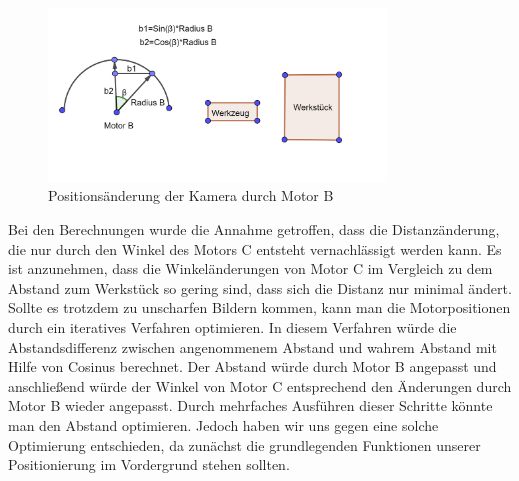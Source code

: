 \documentclass[12pt,a4paper,bibliography=totocnumbered,listof=totocnumbered]{scrartcl}
\begin{document}
\begin{figure}[htbp]
\centering 
\includegraphics[width=0.8\textwidth]{Motor_B.PNG}
\caption{Positionsänderung der Kamera durch Motor B}
\label{fig:Bild8}
\end{figure}
\break
Bei den Berechnungen wurde die Annahme getroffen, dass die Distanzänderung, die nur durch den Winkel des Motors C entsteht vernachlässigt werden kann. Es ist anzunehmen, dass die Winkeländerungen von Motor C im Vergleich zu dem Abstand zum Werkstück so gering sind, dass sich die Distanz nur minimal ändert. Sollte es trotzdem zu unscharfen Bildern kommen, kann man die Motorpositionen durch ein iteratives Verfahren optimieren. In diesem Verfahren würde die Abstandsdifferenz zwischen angenommenem Abstand und wahrem Abstand mit Hilfe von Cosinus berechnet. Der Abstand würde durch Motor B angepasst und anschließend würde der Winkel von Motor C entsprechend den Änderungen durch Motor B wieder angepasst. Durch mehrfaches Ausführen dieser Schritte könnte man den Abstand optimieren. Jedoch haben wir uns gegen eine solche Optimierung entschieden, da zunächst die grundlegenden Funktionen unserer Positionierung im Vordergrund stehen sollten. 
\end{document}
